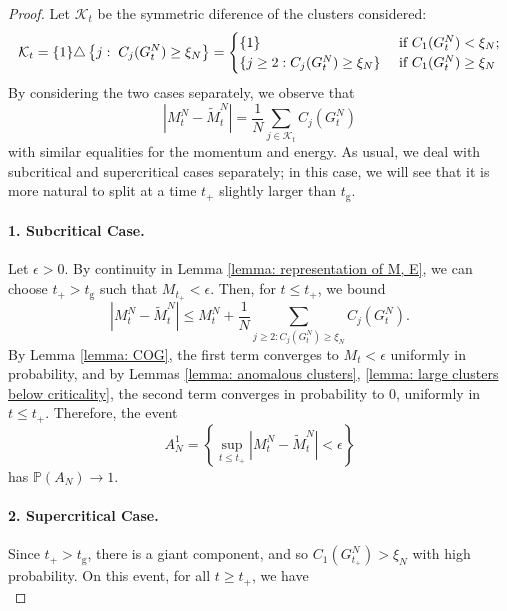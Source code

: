    \begin{proof} Let $\mathcal{K}_t$ be the symmetric diference of the clusters considered: \begin{equation}
      \mathcal{K}_t=\{1\}\triangle\left\{j: \hspace{0.1cm}C_j(G^N_t)\ge \xi_N \right\}=\begin{cases} \{1\} & \text{ if } C_1(G^N_t)< \xi_N; \\ \{j\ge 2: C_j(G^N_t) \ge \xi_N\} & \text{ if } C_1(G^N_t) \ge \xi_N \end{cases}  
  \end{equation} By considering the two cases separately, we observe that \begin{equation}
          \left|M^N_t-\widetilde{M}^N_t\right|=\frac{1}{N}\sum_{j\in\mathcal{K}_t} C_j(G^N_t) 
      \end{equation} with similar equalities for the momentum and energy. As usual, we deal with subcritical and supercritical cases separately; in this case, we will see that it is more natural to split at a time $t_+$ slightly larger than $t_\mathrm{g}.$\paragraph{1. Subcritical Case.} Let $\epsilon>0$. By continuity in Lemma \ref{lemma: representation of M, E}, we can choose $t_+>t_\mathrm{g}$ such that $M_{t_+}<\epsilon.$ Then, for $t\le t_+$, we bound \begin{equation}
          \left|M^N_t-\widetilde{M}^N_t\right| \le M^N_t +\frac{1}{N}\sum_{j\ge 2: C_j(G^N_t)\ge \xi_N} C_j(G^N_t).
      \end{equation} By Lemma \ref{lemma: COG}, the first term converges to $M_t <\epsilon$ uniformly in probability, and by Lemmas \ref{lemma: anomalous clusters}, \ref{lemma: large clusters below criticality}, the second term converges in probability to $0$, uniformly in $t\le t_+$. Therefore, the event \begin{equation}
          A^1_N=\left\{\sup_{t\le t_+} \left|M^N_t-\widetilde{M}^N_t\right|<\epsilon\right\}
      \end{equation} has $\mathbb{P}(A_N)\rightarrow 1.$ \paragraph{2. Supercritical Case.} Since $t_+>t_\mathrm{g}$, there is a giant component, and so $C_1(G^N_{t_+})>\xi_N$ with high probability. On this event, for all $t\ge t_+$, we have \begin{equation}

\end{equation}
\end{proof}
